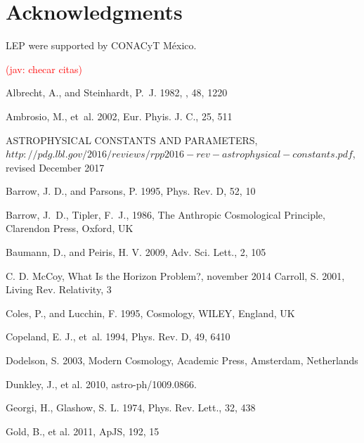 \documentclass{rmaa}
\newcommand{\jav}[1]{\textcolor{red}{(jav: #1)}}
\begin{document}
\section{Acknowledgments }

LEP were supported by CONACyT M\'exico.


%

\jav{checar citas}
\begin{thebibliography}


 Albrecht, A., and {Steinhardt,} P.~J. 1982, \prl, 48,  1220  

Ambrosio, M., et~al. 2002, Eur. Phyis. J. C., 25, 511  

 ASTROPHYSICAL CONSTANTS AND PARAMETERS,\\ \footnotesize{$http://pdg.lbl.gov/2016/reviews/rpp2016-rev-astrophysical-constants.pdf$}, revised December 2017

Barrow, J. D., and {Parsons}, P. 1995, Phys. Rev. D, 52, 10 
  
Barrow, J.~D., Tipler, F.~J., 1986, The Anthropic Cosmological Principle,
  Clarendon Press, Oxford, UK 

 Baumann, D., and  {Peiris,} H. V. 2009, Adv. Sci. Lett., 2, 105

C. D. McCoy, What Is the Horizon Problem?, november 2014
Carroll, S. 2001, Living Rev. Relativity, 3
   
Coles, P., and Lucchin, F. 1995, Cosmology, WILEY, England, UK 

  Copeland, E. J., et~al. 1994, Phys. Rev. D, 49, 6410

Dodelson, S. 2003, Modern Cosmology, Academic Press, Amsterdam, Netherlands 

  Dunkley, J.,  et al. 2010, astro-ph/1009.0866. 
 
Georgi, H., Glashow, S. L. 1974, Phys. Rev. Lett., 32, 438
 
Gold, B., et al. 2011, ApJS, 192, 15


\end{thebibliography}
\end{document}
